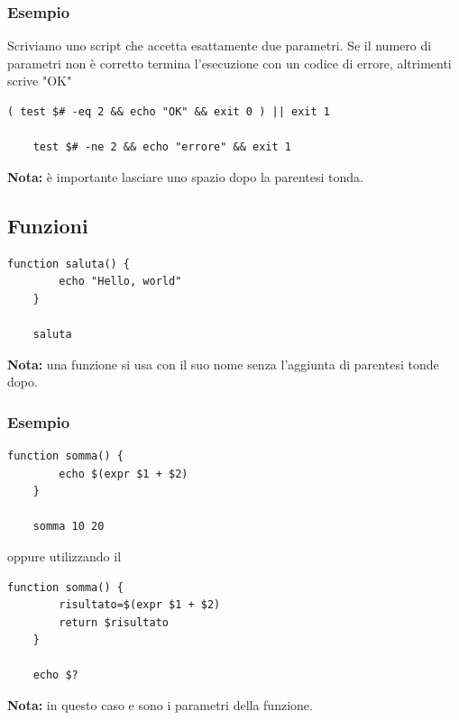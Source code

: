 \documentclass[../main.tex]{subfiles}
\begin{document}
\vspace{0.25cm}
\subsubsection{Esempio}
Scriviamo uno script che accetta esattamente due parametri. Se il numero di parametri non è corretto termina l'esecuzione con un codice 
di errore, altrimenti scrive "OK"
\begin{lstlisting}[style=bash]
    ( test $# -eq 2 && echo "OK" && exit 0 ) || exit 1

    test $# -ne 2 && echo "errore" && exit 1
\end{lstlisting}
\textbf{Nota:} è importante lasciare uno spazio dopo la parentesi tonda.

\vspace{1cm}
\subsection{Funzioni}
\begin{lstlisting}[style=bash]
    function saluta() {
        echo "Hello, world"
    }

    saluta
\end{lstlisting}
\textbf{Nota:} una funzione si usa con il suo nome senza l'aggiunta di parentesi tonde dopo.

\vspace{0.25cm}
\subsubsection{Esempio}
\begin{lstlisting}[style=bash]
    function somma() {
        echo $(expr $1 + $2)
    }

    somma 10 20
\end{lstlisting}

oppure utilizzando il 

\begin{lstlisting}[style=bash]
    function somma() {
        risultato=$(expr $1 + $2)
        return $risultato
    }

    echo $?
\end{lstlisting}
\textbf{Nota:} in questo caso  e  sono i parametri della funzione. 
\end{document}
